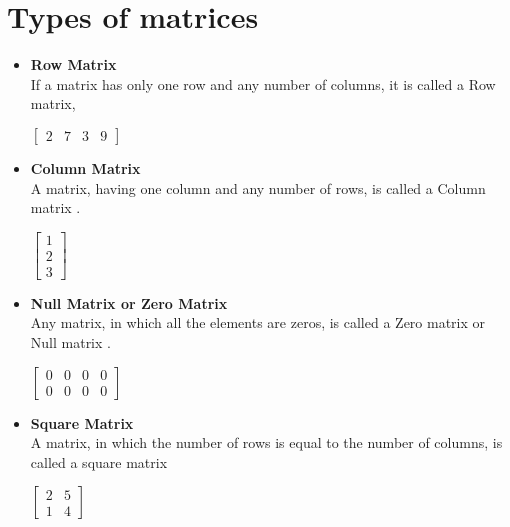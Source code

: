 \section{Types of matrices}
\begin{itemize}
	\item \textbf{Row Matrix}\\
	If a matrix has only one row and any number of columns, it is called a Row matrix, \begin{example}
		$\left[\begin{array}{llll}
		2 & 7 & 3 & 9
	\end{array}\right]$
	\end{example}

	\item \textbf{Column Matrix}\\
	 A matrix, having one column and any number of rows, is called a Column  matrix .
	\begin{example}
		$
	\text {}\left[\begin{array}{l}
		1 \\
		2 \\
		3
	\end{array}\right]
	$
	\end{example}
	\item \textbf{Null Matrix or Zero Matrix}\\
	 Any matrix, in which all the elements are zeros, is called a Zero matrix or Null matrix .
	\begin{example}
		$
	\left[\begin{array}{llll}
		0 & 0 & 0 & 0 \\
		0 & 0 & 0 & 0
	\end{array}\right]
	$
	\end{example}
	\item \textbf{Square Matrix }\\
	A matrix, in which the number of rows is equal to the number of columns, is called a square matrix 
\begin{example}
		$\left[\begin{array}{ll}
		2 & 5 \\
		1 & 4
	\end{array}\right]$
\end{example}


\end{itemize}
